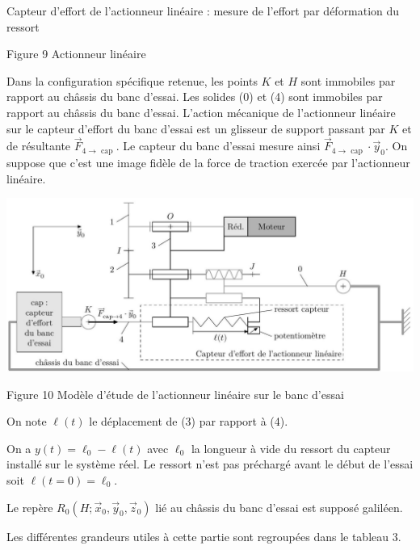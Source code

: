 \documentclass[10pt]{article}
\begin{document}
Capteur d'effort de l'actionneur linéaire : mesure de l'effort par déformation du ressort

Figure 9 Actionneur linéaire

Dans la configuration spécifique retenue, les points $K$ et $H$ sont immobiles par rapport au châssis du banc d'essai. Les solides (0) et (4) sont immobiles par rapport au châssis du banc d'essai. L'action mécanique de l'actionneur linéaire sur le capteur d'effort du banc d'essai est un glisseur de support passant par $K$ et de résultante $\vec{F}_{4 \rightarrow \text { cap }}$. Le capteur du banc d'essai mesure ainsi $\vec{F}_{4 \rightarrow \text { cap }} \cdot \vec{y}_{0}$. On suppose que c'est une image fidèle de la force de traction exercée par l'actionneur linéaire.

\begin{center}
\includegraphics[max width=\textwidth]{2024_03_20_0c3cf888f6e04b1986bcg-07}
\end{center}

Figure 10 Modèle d'étude de l'actionneur linéaire sur le banc d'essai

On note $\ell(t)$ le déplacement de (3) par rapport à (4).

On a $y(t)=\ell_{0}-\ell(t)$ avec $\ell_{0}$ la longueur à vide du ressort du capteur installé sur le système réel. Le ressort n'est pas préchargé avant le début de l'essai soit $\ell(t=0)=\ell_{0}$.

Le repère $R_{0}\left(H ; \vec{x}_{0}, \vec{y}_{0}, \vec{z}_{0}\right)$ lié au châssis du banc d'essai est supposé galiléen.

Les différentes grandeurs utiles à cette partie sont regroupées dans le tableau 3.
\end{document}
